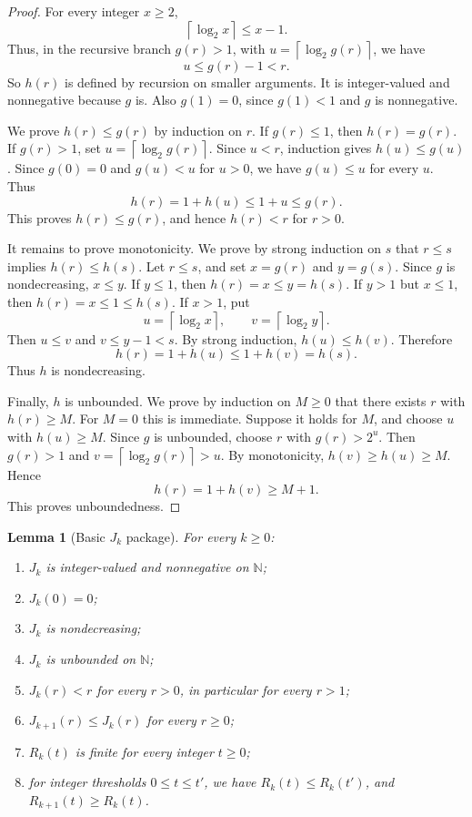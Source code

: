 ﻿\documentclass[11pt]{article}
\newtheorem{lemma}[theorem]{Lemma}
\newcommand{\N}{\mathbb{N}}
\newcommand{\ceil}[1]{\left\lceil #1 \right\rceil}
\begin{document}
\begin{proof}
For every integer $x\ge2$,
\[
\ceil{\log_2 x}\le x-1.
\]
Thus, in the recursive branch $g(r)>1$, with $u=\ceil{\log_2 g(r)}$, we have
\[
u\le g(r)-1<r.
\]
So $h(r)$ is defined by recursion on smaller arguments.  It is integer-valued and nonnegative because $g$ is.  Also $g(1)=0$, since $g(1)<1$ and $g$ is nonnegative.

We prove $h(r)\le g(r)$ by induction on $r$.  If $g(r)\le1$, then $h(r)=g(r)$.  If $g(r)>1$, set $u=\ceil{\log_2 g(r)}$.  Since $u<r$, induction gives $h(u)\le g(u)$.  Since $g(0)=0$ and $g(u)<u$ for $u>0$, we have $g(u)\le u$ for every $u$.  Thus
\[
h(r)=1+h(u)\le1+u\le g(r).
\]
This proves $h(r)\le g(r)$, and hence $h(r)<r$ for $r>0$.

It remains to prove monotonicity.  We prove by strong induction on $s$ that $r\le s$ implies $h(r)\le h(s)$.  Let $r\le s$, and set $x=g(r)$ and $y=g(s)$.  Since $g$ is nondecreasing, $x\le y$.  If $y\le1$, then $h(r)=x\le y=h(s)$.  If $y>1$ but $x\le1$, then $h(r)=x\le1\le h(s)$.  If $x>1$, put
\[
u=\ceil{\log_2 x},
\qquad
v=\ceil{\log_2 y}.
\]
Then $u\le v$ and $v\le y-1<s$.  By strong induction, $h(u)\le h(v)$.  Therefore
\[
h(r)=1+h(u)\le1+h(v)=h(s).
\]
Thus $h$ is nondecreasing.

Finally, $h$ is unbounded.  We prove by induction on $M\ge0$ that there exists $r$ with $h(r)\ge M$.  For $M=0$ this is immediate.  Suppose it holds for $M$, and choose $u$ with $h(u)\ge M$.  Since $g$ is unbounded, choose $r$ with $g(r)>2^u$.  Then $g(r)>1$ and $v=\ceil{\log_2 g(r)}>u$.  By monotonicity, $h(v)\ge h(u)\ge M$.  Hence
\[
h(r)=1+h(v)\ge M+1.
\]
This proves unboundedness.
\end{proof}

\begin{lemma}[Basic $J_k$ package]\label{lem:J-package}
For every $k\ge0$:
\begin{enumerate}[label=(\roman*)]
\item $J_k$ is integer-valued and nonnegative on $\N$;
\item $J_k(0)=0$;
\item $J_k$ is nondecreasing;
\item $J_k$ is unbounded on $\N$;
\item $J_k(r)<r$ for every $r>0$, in particular for every $r>1$;
\item $J_{k+1}(r)\le J_k(r)$ for every $r\ge0$;
\item $R_k(t)$ is finite for every integer $t\ge0$;
\item for integer thresholds $0\le t\le t'$, we have $R_k(t)\le R_k(t')$, and $R_{k+1}(t)\ge R_k(t)$.
\end{enumerate}
\end{lemma}
\end{document}
